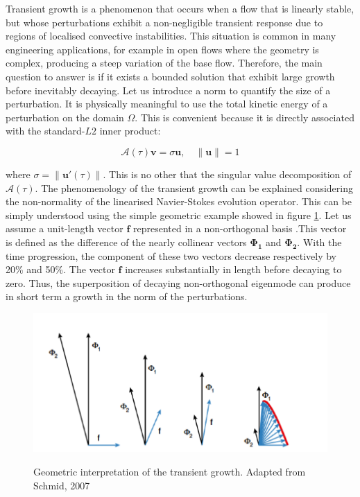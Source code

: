 Transient growth  is a phenomenon that occurs when a flow that is linearly stable, but whose perturbations exhibit a non-negligible transient response due to regions of localised convective instabilities. This situation is common in many engineering applications, for example in open flows where the geometry is complex, producing a steep variation of the base flow. Therefore, the main question to answer is if it exists a bounded solution that exhibit large growth before inevitably decaying. Let us introduce a norm to quantify the size of a perturbation. It is physically meaningful to use the total kinetic energy of a perturbation on the domain $\Omega$. This is convenient because it is directly associated with the
standard-$L2$ inner product:

\begin{equation}
\mathcal{A}(\tau)\mathbf{v}=\sigma \mathbf{u}, \quad \left\| \mathbf{u} \right\|=1
\end{equation}


where $\sigma=\left\| \mathbf{u'}(\tau)\right\|$. This is no other
that the singular value decomposition of $\mathcal{A}(\tau)$. The
phenomenology of the transient growth can be explained considering the
non-normality of the linearised Navier-Stokes evolution operator. This
can be simply understood using the simple geometric example showed in
figure \ref{TG}. Let us assume a unit-length vector $\mathbf{f}$
represented in a non-orthogonal basis .This vector is defined as the
difference of the nearly collinear vectors $\mathbf{\Phi_1}$ and
$\mathbf{\Phi_2}$.  With the time progression, the component of these
two vectors decrease respectively by 20\% and 50\%. The vector
$\mathbf{f}$ increases substantially in length before decaying to
zero. Thus, the superposition of decaying non-orthogonal eigenmode can
produce in short term a growth in the norm of the perturbations.


\begin{figure}[!htbp]
\centering
 \label{TG}
 {\includegraphics[width=1 \textwidth]{img/transient_growth.png}}
   \caption {Geometric interpretation of the transient growth. Adapted from Schmid, 2007 }
\end{figure}


